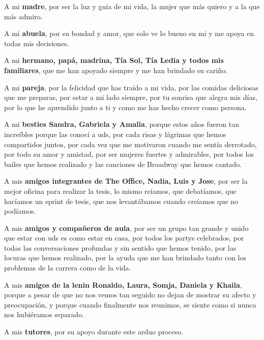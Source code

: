 \begin{acknowledgements}
A mi \textbf{madre}, por ser la luz y guía de mi vida, la mujer que más quiero y a la que más admiro.

A mi \textbf{abuela}, por su bondad y amor, que solo ve lo bueno en mi y me apoya en todas mis decisiones.

A mi \textbf{hermano, papá, madrina, Tía Sol, Tía Ledia y todos mis familiares}, que me han apoyado siempre y me han brindado su cariño.

A mi \textbf{pareja}, por la felicidad que has traído a mi vida, por las comidas deliciosas que me preparas, por estar a mi lado siempre, por tu sonrisa que alegra mis días, por lo que he aprendido junto a ti y como me has hecho crecer como persona.

A mi \textbf{besties Sandra, Gabriela y Amalia}, porque estos años fueron tan increíbles porque las conocí a uds, por cada risas y lágrimas que hemos compartidos juntos, por cada vez que me motivaron cuando me sentía derrotado, por todo su amor y amistad, por ser mujeres fuertes y admirables, por todos los bailes que hemos realizado y las canciones de Broadway que hemos cantado.

A mis \textbf{amigos integrantes de The Office, Nadia, Luis y Jose}, por ser la mejor oficina para realizar la tesis, lo mismo reíamos, que debatíamos, que hacíamos un sprint de tesis, que nos levantábamos cuando creíamos que no podíamos.

A mis \textbf{amigos y compañeros de aula}, por ser un grupo tan grande y unido que estar con uds es como estar en casa, por todos los partys celebrados, por todas las conversaciones profundas y sin sentido que hemos tenido, por las locuras que hemos realizado, por la ayuda que me han brindado tanto con los problemas de la carrera como de la vida.

A mis \textbf{amigos de la lenin Ronaldo, Laura, Somja, Daniela y Khaila}, porque a pesar de que no nos vemos tan seguido no dejan de mostrar su afecto y preocupación, y porque cuando finalmente nos reunimos, se siente como si nunca nos hubiéramos separado.

A mis \textbf{tutores}, por su apoyo durante este arduo proceso.
\end{acknowledgements}